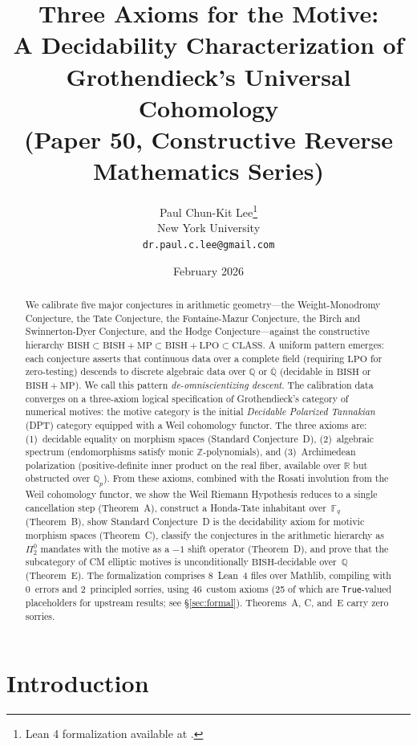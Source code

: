 \documentclass[11pt]{article}
\title{Three Axioms for the Motive:\\
A Decidability Characterization of\\
Grothendieck's Universal Cohomology\\[6pt]
{\large (Paper 50, Constructive Reverse Mathematics Series)}}
\author{Paul Chun-Kit Lee\thanks{Lean 4 formalization available at \leanRepo.} \\
New York University \\
\texttt{dr.paul.c.lee@gmail.com}}
\date{February 2026}
\theoremstyle{definition}
\theoremstyle{remark}
\newcommand{\Z}{\mathbb{Z}}
\newcommand{\Q}{\mathbb{Q}}
\newcommand{\R}{\mathbb{R}}
\newcommand{\Qbar}{\overline{\Q}}
\newcommand{\Qp}{\Q_p}
\newcommand{\Fq}{\mathbb{F}_q}
\newcommand{\LPO}{\mathrm{LPO}}
\newcommand{\MP}{\mathrm{MP}}
\newcommand{\BISH}{\mathrm{BISH}}
\newcommand{\CLASS}{\mathrm{CLASS}}
\begin{document}
\maketitle

\begin{abstract}
We calibrate five major conjectures in arithmetic geometry---the Weight-Monodromy Conjecture, the Tate Conjecture, the Fontaine-Mazur Conjecture, the Birch and Swinnerton-Dyer Conjecture, and the Hodge Conjecture---against the constructive hierarchy $\BISH \subset \BISH{+}\MP \subset \BISH{+}\LPO \subset \CLASS$. A uniform pattern emerges: each conjecture asserts that continuous data over a complete field (requiring $\LPO$ for zero-testing) descends to discrete algebraic data over $\Q$ or $\Qbar$ (decidable in $\BISH$ or $\BISH{+}\MP$). We call this pattern \emph{de-omniscientizing descent}. The calibration data converges on a three-axiom logical specification of Grothendieck's category of numerical motives: the motive category is the initial \emph{Decidable Polarized Tannakian} (DPT) category equipped with a Weil cohomology functor. The three axioms are: (1)~decidable equality on morphism spaces (Standard Conjecture~D), (2)~algebraic spectrum (endomorphisms satisfy monic $\Z$-polynomials), and (3)~Archimedean polarization (positive-definite inner product on the real fiber, available over $\R$ but obstructed over $\Qp$). From these axioms, combined with the Rosati involution from the Weil cohomology functor, we show the Weil Riemann Hypothesis reduces to a single cancellation step (Theorem~A), construct a Honda-Tate inhabitant over~$\Fq$ (Theorem~B), show Standard Conjecture~D is the decidability axiom for motivic morphism spaces (Theorem~C), classify the conjectures in the arithmetic hierarchy as $\Pi_2^0$ mandates with the motive as a $-1$ shift operator (Theorem~D), and prove that the subcategory of CM elliptic motives is unconditionally $\BISH$-decidable over~$\Q$ (Theorem~E). The formalization comprises 8~Lean~4 files over Mathlib, compiling with 0~errors and 2~principled sorries, using 46~custom axioms (25 of which are \texttt{True}-valued placeholders for upstream results; see \S\ref{sec:formal}). Theorems~A, C, and~E carry zero sorries.
\end{abstract}

\tableofcontents

\section{Introduction}
\label{sec:intro}
\end{document}
